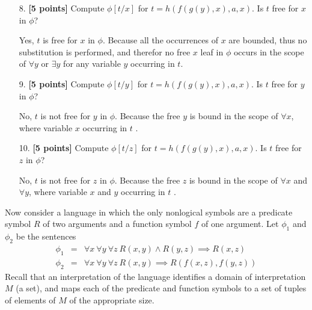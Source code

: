 \documentclass{article}
\begin{document}
\begin{enumerate}
\item[8.] \textbf{[5 points]} Compute $\phi[t/x]$ for
  $t = h(f(g(y),x),a,x)$.  Is $t$ free for $x$ in $\phi$?
  \begin{answer}
    Yes, $t$ is free for $x$ in $\phi$. Because all the occurrences of $x$ are bounded, 
    thus no substitution is performed, and therefor no free $x$ leaf in $\phi$ occurs 
    in the scope of $\forall y$ or $\exists y$ for any variable $y$ occurring in $t$.
  \end{answer}
\end{enumerate}

\begin{enumerate}
\item[9.] \textbf{[5 points]} Compute $\phi[t/y]$ for
  $t = h(f(g(y),x),a,x)$.  Is $t$ free for $y$ in $\phi$?
  \begin{answer}
    No, $t$ is not free for $y$ in $\phi$. Because the free $y$ is bound in the scope 
    of $\forall x$, where variable $x$ occurring in $t$ .
  \end{answer}
\end{enumerate}

\begin{enumerate}
\item[10.] \textbf{[5 points]} Compute $\phi[t/z]$ for
  $t = h(f(g(y),x),a,x)$.  Is $t$ free for $z$ in $\phi$?
  \begin{answer}
    No, $t$ is not free for $z$ in $\phi$. Because the free $z$ is bound in the scope 
    of $\forall x$ and $\forall y$, where variable $x$ and $y$ occurring in $t$ .
  \end{answer}
\end{enumerate}

\noindent
Now consider a language in which the only nonlogical symbols are a
predicate symbol $R$ of two arguments and a function symbol $f$ of one
argument.  Let $\phi_1$ and $\phi_2$ be the sentences
\begin{eqnarray*}
  \phi_1 
  & =
  & \forall x\ \forall y\ \forall z\
    R(x,y) \land R(y,z) \implies R(x,z) 
  \\
  \phi_2
  & = 
  & \forall x\ \forall y\ \forall z\
    R(x,y) \implies R(f(x,z),f(y,z))
\end{eqnarray*}
Recall that an interpretation of the language identifies a domain of
interpretation $M$ (a set), and maps each of the predicate and
function symbols to a set of tuples of elements of $M$ of the
appropriate size.
\end{document}
